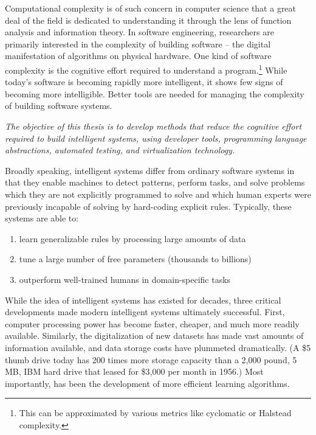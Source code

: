 \documentclass[12pt,initial,twoside,maitrise]{dms}
\numberwithin{equation}{section}
\numberwithin{table}{chapter}
\numberwithin{figure}{chapter}
\begin{document}
Computational complexity is of such concern in computer science that a great deal of the field is dedicated to understanding it through the lens of function analysis and information theory. In software engineering, researchers are primarily interested in the complexity of building software -- the digital manifestation of algorithms on physical hardware. One kind of software complexity is the cognitive effort required to understand a program.\hspace{-.08em}\footnote{This can be approximated by various metrics like cyclomatic or Halstead complexity.} While today's software is becoming rapidly more intelligent, it shows few signs of becoming more intelligible. Better tools are needed for managing the complexity of building software systems.

\textit{The objective of this thesis is to develop methods that reduce the cognitive effort required to build intelligent systems, using developer tools, programming language abstractions, automated testing, and virtualization technology.}

Broadly speaking, intelligent systems differ from ordinary software systems in that they enable machines to detect patterns, perform tasks, and solve problems which they are not explicitly programmed to solve and which human experts were previously incapable of solving by hard-coding explicit rules. Typically, these systems are able to:\\
%
\begin{enumerate}
    \item learn generalizable rules by processing large amounts of data
    \item tune a large number of free parameters (thousands to billions)
    \item outperform well-trained humans in domain-specific tasks
\end{enumerate}
%
While the idea of intelligent systems has existed for decades, three critical developments made modern intelligent systems ultimately successful. First, computer processing power has become faster, cheaper, and much more readily available. Similarly, the digitalization of new datasets has made vast amounts of information available, and data storage costs have plummeted dramatically. (A \$5 thumb drive today has 200 times more storage capacity than a 2,000 pound, 5 MB, IBM hard drive that leased for \$3,000 per month in 1956.) Most importantly, has been the development of more efficient learning algorithms.
\end{document}
